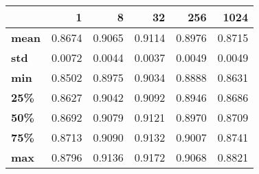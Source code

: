 \begin{tabular}{lrrrrr}
\toprule
{} &       1 &       8 &      32 &     256 &    1024 \\
\midrule
\textbf{mean} &  0.8674 &  0.9065 &  0.9114 &  0.8976 &  0.8715 \\
\textbf{std } &  0.0072 &  0.0044 &  0.0037 &  0.0049 &  0.0049 \\
\textbf{min } &  0.8502 &  0.8975 &  0.9034 &  0.8888 &  0.8631 \\
\textbf{25\% } &  0.8627 &  0.9042 &  0.9092 &  0.8946 &  0.8686 \\
\textbf{50\% } &  0.8692 &  0.9079 &  0.9121 &  0.8970 &  0.8709 \\
\textbf{75\% } &  0.8713 &  0.9090 &  0.9132 &  0.9007 &  0.8741 \\
\textbf{max } &  0.8796 &  0.9136 &  0.9172 &  0.9068 &  0.8821 \\
\bottomrule
\end{tabular}
